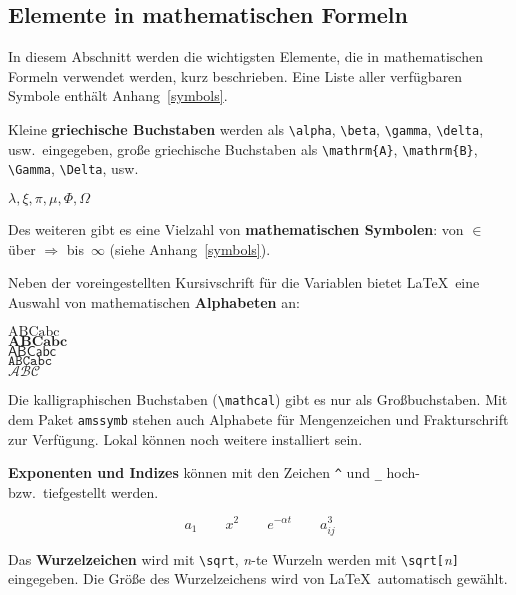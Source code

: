 \subsection{Elemente in mathematischen Formeln}

In diesem Abschnitt werden die wichtigsten Elemente, die in
mathematischen Formeln verwendet werden, kurz beschrieben.  Eine
Liste aller verfügbaren Symbole enthält
Anhang~\vref{symbols}.

\bigskip

Kleine \textbf{griechische Buchstaben} werden als \lstinline|\alpha|,
\lstinline|\beta|, \lstinline|\gamma|, \lstinline|\delta|, usw.\ eingegeben,
große griechische Buchstaben als \lstinline|\mathrm{A}|,
\lstinline|\mathrm{B}|, \lstinline|\Gamma|, \lstinline|\Delta|, usw.

\begin{LTXexample}
$\lambda, \xi, \pi, \mu,
 \Phi, \Omega $
\end{LTXexample}


Des weiteren gibt es eine Vielzahl von \textbf{mathematischen Symbolen}:
von $\in$ über $\Rightarrow$ bis~$\infty$ (siehe
Anhang~\vref{symbols}).

\bigskip

Neben der voreingestellten Kursivschrift für die Variablen
bietet \LaTeX\ eine Auswahl von mathematischen \textbf{Alphabeten} an:
\begin{LTXexample}
$\mathrm{ABCabc}$ \\
$\mathbf{ABCabc}$ \\
$\mathsf{ABCabc}$ \\
$\mathtt{ABCabc}$ \\
$\mathcal{ABC}$
\end{LTXexample}

Die kalligraphischen Buchstaben (\lstinline:\mathcal:) gibt es nur als
Großbuchstaben. Mit dem Paket \texttt{amssymb} \cite{ch8} stehen
auch Alphabete für Mengenzeichen und Frakturschrift zur Verfügung.
Lokal können noch weitere installiert sein.


\bigskip

\textbf{Exponenten und Indizes} können mit den Zeichen \lstinline|^|
und \lstinline|_| hoch- bzw.\ tiefgestellt werden.

\begin{LTXexample}
\[
a_{1} \qquad x^{2} \qquad
 e^{-\alpha t} \qquad a^{3}_{ij}
\]
\end{LTXexample}


Das \textbf{Wurzelzeichen} wird mit \lstinline|\sqrt|, \textit{n}-te
Wurzeln werden mit \lstinline|\sqrt[|\textit{n}\lstinline|]| eingegeben.
Die Größe des Wurzelzeichens wird von \LaTeX\ automatisch
gewählt.

